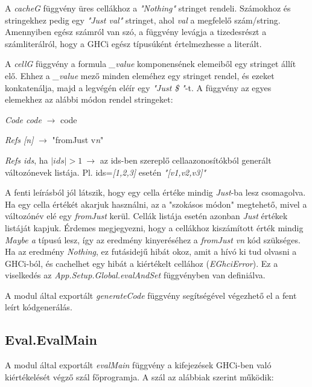A \textit{cacheG} függvény üres cellákhoz a \textit{"Nothing"} stringet rendeli. Számokhoz és stringekhez pedig egy \textit{"Just val"} stringet, ahol \textit{val} a megfelelő szám/string. Amennyiben egész számról van szó, a függvény levágja a tizedesrészt a számliterálról, hogy a GHCi egész típusúként értelmezhesse a literált.

A \textit{cellG} függvény a formula \textit{\_value} komponensének elemeiből egy stringet állít elő. Ehhez a \textit{\_value} mező minden eleméhez egy stringet rendel, és ezeket konkatenálja, majd a legvégén eléír egy \textit{"Just \$ "}-t. A függvény az egyes elemekhez az alábbi módon rendel stringeket:
\begin{compactenum}
	\item \textit{Code code} $\rightarrow$ code
	\item \textit{Refs [n]} $\rightarrow$ "fromJust v\textit{n}"
	\item \textit{Refs ids}, ha $|ids| > 1 \ \rightarrow$ az ids-ben szereplő cellaazonosítókból generált változónevek listája. Pl. ids=\textit{[1,2,3]} esetén \textit{"[v1,v2,v3]"}
\end{compactenum}

A fenti leírásból jól látszik, hogy egy cella értéke mindig \textit{Just}-ba lesz csomagolva. Ha egy cella értékét akarjuk használni, az a "szokásos módon" megtehető, mivel a változónév elé egy \textit{fromJust} kerül. Cellák listája esetén azonban \textit{Just} értékek listáját kapjuk. Érdemes megjegyezni, hogy a cellákhoz kiszámított érték mindig \textit{Maybe a} típusú lesz, így az eredmény kinyeréséhez a \textit{fromJust vn} kód szükséges. Ha az eredmény \textit{Nothing}, ez futásidejű hibát okoz, amit a hívó ki tud olvasni a GHCi-ból, és cachelhet egy hibát a kiértékelt cellához (\textit{EGhciError}). Ez a viselkedés az \textit{App.Setup.Global.evalAndSet} függvényben van definiálva.

A modul által exportált \textit{generateCode} függvény segítségével végezhető el a fent leírt kódgenerálás. 

\subsection{Eval.EvalMain}

A modul által exportált \textit{evalMain} függvény a kifejezések GHCi-ben való kiértékelését végző szál főprogramja. A szál az alábbiak szerint működik:

